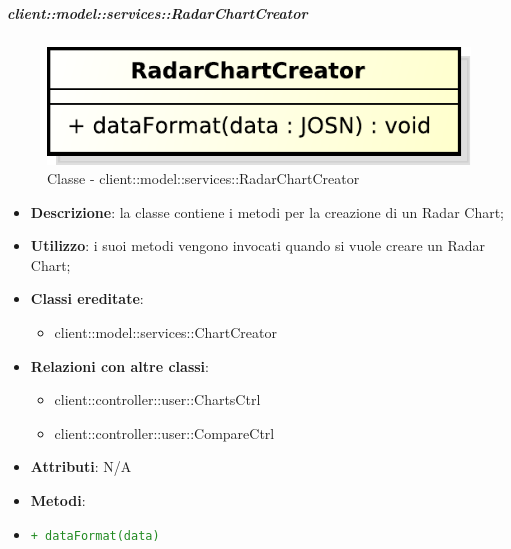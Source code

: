 		\subparagraph{client::model::services::RadarChartCreator} %
		\label{subp:radarchartcreator}
			\begin{figure}[htbp]
				\centering
				\centerline{\includegraphics[scale=0.7]{./images/client/classes/model/radar_chart_creator.pdf}}
				\caption{Classe - client::model::services::RadarChartCreator}
			\end{figure}
			\begin{itemize}
				\item \textbf{Descrizione}: la classe contiene i metodi per la creazione di un Radar Chart;
				\item \textbf{Utilizzo}: i suoi metodi vengono invocati quando si vuole creare un Radar Chart;
				\item \textbf{Classi ereditate}:
					\begin{itemize}
						\item client::model::services::ChartCreator
					\end{itemize}
				\item \textbf{Relazioni con altre classi}:
					\begin{itemize}
						\item client::controller::user::ChartsCtrl
						\item client::controller::user::CompareCtrl
					\end{itemize}
				\item \textbf{Attributi}: N/A
				\item \textbf{Metodi}: 
					\item \textcolor{forestgreen}{\texttt{+ dataFormat(data)}}
			\end{itemize}

